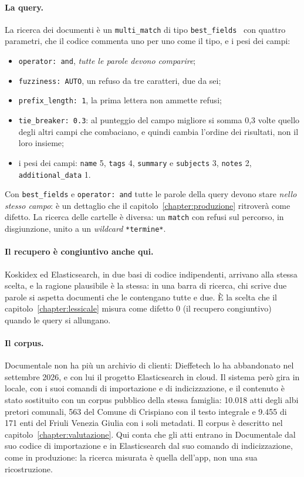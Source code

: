 \paragraph{La query.} La ricerca dei documenti è un \texttt{multi\allowbreak\_match}
di tipo \texttt{best\allowbreak\_fields}~\cite{es-multimatch} con quattro parametri, che
il codice commenta uno per uno come il tipo, e i pesi dei campi:
\begin{itemize}
  \item \texttt{operator: and}, \emph{tutte le parole devono comparire};
  \item \texttt{fuzziness: AUTO}, un refuso da tre caratteri, due da sei;
  \item \texttt{prefix\_length: 1}, la prima lettera non ammette refusi;
  \item \texttt{tie\_breaker: 0.3}: al punteggio del campo migliore si somma
        0,3 volte quello degli altri campi che combaciano, e quindi cambia
        l'ordine dei risultati, non il loro insieme;
  \item i pesi dei campi: \texttt{name} 5, \texttt{tags} 4, \texttt{summary} e
        \texttt{subjects} 3, \texttt{notes} 2, \texttt{additional\_data} 1.
\end{itemize}
Con \texttt{best\_fields} e \texttt{operator: and} tutte le parole della query
devono stare \emph{nello stesso campo}: è un dettaglio che il
capitolo~\ref{chapter:produzione} ritroverà come difetto. La ricerca delle
cartelle è diversa: un \texttt{match} con refusi sul percorso, in disgiunzione,
unito a un \emph{wildcard} \texttt{*termine*}.

\paragraph{Il recupero è congiuntivo anche qui.} Koskidex ed Elasticsearch, in
due basi di codice indipendenti, arrivano alla stessa scelta, e la ragione plausibile è la stessa:
in una barra di ricerca, chi scrive due parole si aspetta documenti che
le contengano tutte e due. È la scelta che il capitolo~\ref{chapter:lessicale}
misura come difetto 0 (il recupero congiuntivo) quando le query si allungano.

\paragraph{Il corpus.} Documentale non ha più un archivio di clienti: Dieffetech
lo ha abbandonato nel settembre 2026, e con lui il progetto Elasticsearch in
cloud. Il sistema però gira in locale, con i suoi comandi di importazione e di
indicizzazione, e il contenuto è stato sostituito con un corpus pubblico della
stessa famiglia: 10.018 atti degli albi pretori comunali, 563 del Comune di
Crispiano con il testo integrale e 9.455 di 171 enti del Friuli Venezia Giulia
con i soli metadati. Il corpus è descritto nel
capitolo~\ref{chapter:valutazione}. Qui conta che gli atti entrano in
Documentale dal suo codice di importazione e in Elasticsearch dal suo comando di
indicizzazione, come in produzione: la ricerca misurata è quella dell'app, non
una sua ricostruzione.

